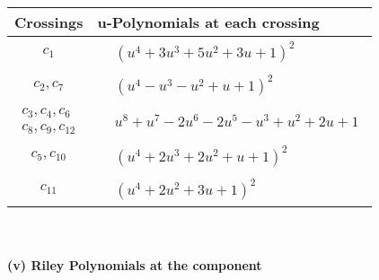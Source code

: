 \documentclass[1p]{elsarticle_modified}
\theoremstyle{definition}
\begin{document}
\begin{tabular}{m{50pt}|m{274pt}}
Crossings & \hspace{64pt}u-Polynomials at each crossing \\
\hline $$\begin{aligned}c_{1}\end{aligned}$$&$\begin{aligned}
&(u^4+3 u^3+5 u^2+3 u+1)^2
\end{aligned}$\\
\hline $$\begin{aligned}c_{2},c_{7}\end{aligned}$$&$\begin{aligned}
&(u^4- u^3- u^2+u+1)^2
\end{aligned}$\\
\hline $$\begin{aligned}c_{3},c_{4},c_{6}\\c_{8},c_{9},c_{12}\end{aligned}$$&$\begin{aligned}
&u^8+u^7-2 u^6-2 u^5- u^3+u^2+2 u+1
\end{aligned}$\\
\hline $$\begin{aligned}c_{5},c_{10}\end{aligned}$$&$\begin{aligned}
&(u^4+2 u^3+2 u^2+u+1)^2
\end{aligned}$\\
\hline $$\begin{aligned}c_{11}\end{aligned}$$&$\begin{aligned}
&(u^4+2 u^2+3 u+1)^2
\end{aligned}$\\
\hline
\end{tabular}\\~\\
\newpage\renewcommand{\arraystretch}{1}
\flushleft \textbf{(v) Riley Polynomials at the component}\newline \\
\end{document}

